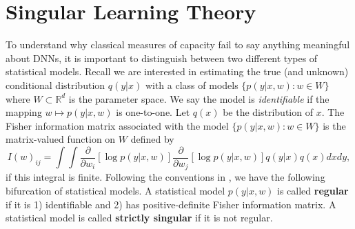 \documentclass{article} %
\begin{document}
\section{Singular Learning Theory}
To understand why classical measures of capacity fail to say anything meaningful about DNNs, it is important to distinguish between two different types of statistical models. Recall we are interested in estimating the true (and unknown) conditional distribution $q(y|x)$ with a class of models $\{p(y|x,w): w \in W\}$ where $W \subset \mathbb R^d$ is the parameter space. We say the model is \textit{identifiable} if the mapping $w \mapsto p(y|x,w)$ is one-to-one. Let $q(x)$ be the distribution of $x$. The Fisher information matrix associated with the model $\{p(y|x,w): w \in W \}$ is the matrix-valued function on $W$ defined by
 \begin{equation*}
 I(w)_{ij} = \int\!\int \frac{\partial}{\partial w_i}[ \log p(y|x,w) ] \frac{\partial}{\partial w_j}[ \log p(y|x,w) ] q(y|x) q(x) dx dy,
 \label{eq:FIM}
 \end{equation*}
if this integral is finite. 
Following the conventions in \citet{watanabe_algebraic_2009}, we have the following bifurcation of statistical models.
A statistical model $p(y|x,w)$ is called \textbf{regular} if it is 1) identifiable and 2) has positive-definite Fisher information matrix. A statistical model is called \textbf{strictly singular} if it is not regular. 
\end{document}
